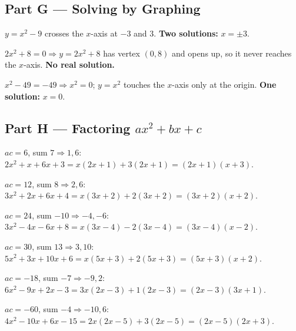 \documentclass[11pt]{article}
\begin{document}
\subsection*{Part G --- Solving by Graphing}
\begin{description}[leftmargin=2.4em,style=nextline,itemsep=4pt]
\item[G1.] $y=x^2-9$ crosses the $x$-axis at $-3$ and $3$. \textbf{Two solutions:} $x=\pm 3$.
\item[G2.] $2x^2+8=0 \Rightarrow y=2x^2+8$ has vertex $(0,8)$ and opens up, so it never reaches the $x$-axis. \textbf{No real solution.}
\item[G3.] $x^2-49=-49 \Rightarrow x^2=0$; $y=x^2$ touches the $x$-axis only at the origin. \textbf{One solution:} $x=0$.
\end{description}

\subsection*{Part H --- Factoring $ax^2 + bx + c$}
\begin{description}[leftmargin=2.4em,style=nextline,itemsep=4pt]
\item[H1.] $ac=6$, sum $7 \Rightarrow 1,6$: $2x^2+x+6x+3 = x(2x+1)+3(2x+1) = (2x+1)(x+3)$.
\item[H2.] $ac=12$, sum $8 \Rightarrow 2,6$: $3x^2+2x+6x+4 = x(3x+2)+2(3x+2) = (3x+2)(x+2)$.
\item[H3.] $ac=24$, sum $-10 \Rightarrow -4,-6$: $3x^2-4x-6x+8 = x(3x-4)-2(3x-4) = (3x-4)(x-2)$.
\item[H4.] $ac=30$, sum $13 \Rightarrow 3,10$: $5x^2+3x+10x+6 = x(5x+3)+2(5x+3) = (5x+3)(x+2)$.
\item[H5.] $ac=-18$, sum $-7 \Rightarrow -9,2$: $6x^2-9x+2x-3 = 3x(2x-3)+1(2x-3) = (2x-3)(3x+1)$.
\item[H6.] $ac=-60$, sum $-4 \Rightarrow -10,6$: $4x^2-10x+6x-15 = 2x(2x-5)+3(2x-5) = (2x-5)(2x+3)$.
\end{description}
\end{document}
